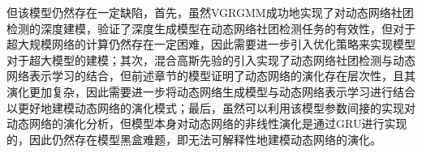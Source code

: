 但该模型仍然存在一定缺陷，首先，虽然VGRGMM成功地实现了对动态网络社团检测的深度建模，验证了深度生成模型在动态网络社团检测任务的有效性，但对于超大规模网络的计算仍然存在一定困难，因此需要进一步引入优化策略来实现模型对于超大模型的建模；其次，混合高斯先验的引入实现了动态网络社团检测与动态网络表示学习的结合，但前述章节的模型证明了动态网络的演化存在层次性，且其演化更加复杂，因此需要进一步将动态网络生成模型与动态网络表示学习进行结合以更好地建模动态网络的演化模式；最后，虽然可以利用该模型参数间接的实现对动态网络的演化分析，但模型本身对动态网络的非线性演化是通过GRU进行实现的，因此仍然存在模型黑盒难题，即无法可解释性地建模动态网络的演化。







